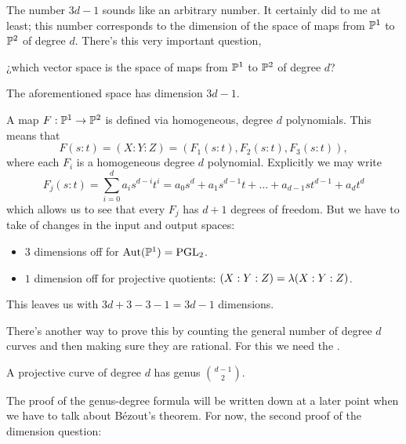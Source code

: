 \documentclass[12pt]{memoir}
\begin{document}
The number $3d-1$ sounds like an arbitrary number. It certainly did to me at least; this number corresponds to the dimension of the space of maps from $\mathbb{P}^1$ to $\mathbb{P}^2$ of degree $d$. There's this very important question, 
\begin{significant}
¿which vector space is the space of maps from $\mathbb{P}^1$ to $\mathbb{P}^2$  of degree $d$?
\end{significant}

\begin{Prop}\label{prop-dimension-maps-P1-to-P2}
The aforementioned space has dimension $3d-1$.
\end{Prop}

\begin{ptcbp}
A map $F:\mathbb{P}^1\to\mathbb{P}^2$ is defined via homogeneous, degree $d$ polynomials. This means that 
$$F(s:t)=(X:Y:Z)=(F_1(s:t),F_2(s:t),F_3(s:t)),$$
where each $F_i$ is a homogeneous degree $d$ polynomial. Explicitly we may write 
$$F_j(s:t)=\sum_{i=0}^da_is^{d-i}t^{i}=a_0s^d+a_1s^{d-1}t+\dots+a_{d-1}st^{d-1}+a_dt^d$$
which allows us to see that every $F_j$ has $d+1$ degrees of freedom. But we have to take of changes in the input and output spaces:
\begin{itemize}
    \item $3$ dimensions off for $\operatorname{Aut}(\mathbb{P}^1)=\operatorname{PGL}_2$.
    \item $1$ dimension off for projective quotients: $(X:Y:Z)=\lambda(X:Y:Z)$.
\end{itemize}
This leaves us with $3d+3-3-1=3d-1$ dimensions. 
\end{ptcbp}

There's another way to prove this by counting the general number of degree $d$ curves and then making sure they are rational. For this we need the .

\begin{Prop}\label{prop-genus-degree-formula}
    A projective curve of degree $d$ has genus $\binom{d-1}{2}$.
\end{Prop}

The proof of the genus-degree formula will be written down at a later point when we have to talk about Bézout's theorem. For now, the second proof of the dimension question:
\end{document}
